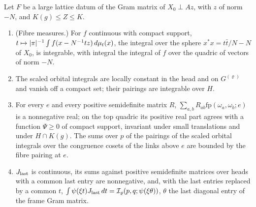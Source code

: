 \begin{proposition}\label{prop:top-floor}
Let $F$ be a large lattice datum of the Gram matrix of $X_0\perp Az$, with $z$ of norm $-N$, and $K(g)\le Z\le K$.
\begin{enumerate}[label=\textup{(\alph*)}]
\item (Fibre measures.) For $f$ continuous with compact support, $t\mapsto\lvert \pi\rvert^{-1}\int f(x-N^{-1}tz)\,d\mu_t(x)$, the integral over the sphere $x^*x=t\bar t/N-N$ of $X_0$, is integrable, with integral the
integral of $f$ over the quadric of vectors of norm $-N$.
\item The scaled orbital integrals are locally constant in the head and on $G^{(\varrho)}$ and vanish off a compact set; their pairings are integrable over $H$.
\item For every $e$ and every positive semidefinite matrix $R$, $\sum_{a,b}R_{ab}\mathrm{fp}(\omega_a,\omega_b;e)$ is a nonnegative real; on the top quadric its positive real part agrees with a function $\Psi\ge0$ of compact
support, invariant under small translations and under $H\cap K(g)$. The sums over $p$ of the pairings of the scaled orbital integrals over the congruence cosets of the links above $e$ are bounded by the fibre
pairing at $e$.
\item $J_{\rm last}$ is continuous, its sums against positive semidefinite matrices over heads with a common last entry are nonnegative, and, with the last entries replaced by a common $t$,
$\int\psi(\xi t)J_{\rm last}\,dt=\mathcal I_\varrho(p,q;\psi(\xi\theta))$, $\theta$ the last diagonal entry of the frame Gram matrix.
\end{enumerate}
\end{proposition}
